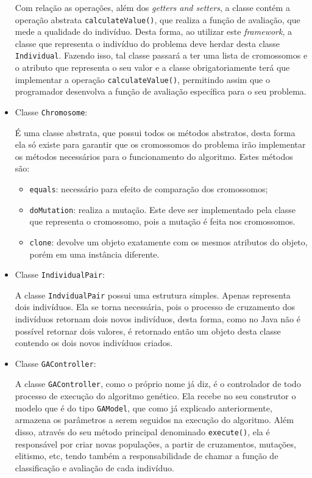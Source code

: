 \begin{itemize}
	\par Com relação as operações, além dos \textit{getters and setters}, a classe contém a operação abstrata 
	\texttt{calculateValue()}, que realiza a função de avaliação, que mede a qualidade do indivíduo. Desta forma, ao utilizar este \textit{framework}, a classe que representa o indivíduo do 
	problema deve herdar desta classe  \texttt{Individual}. Fazendo isso, tal classe passará a ter uma lista de cromossomos 
	e o atributo que representa o seu valor e a classe obrigatoriamente terá que implementar a operação 
	\texttt{calculateValue()}, permitindo assim que o programador 
	desenvolva a função de avaliação específica para o seu problema.
	
	
	\item Classe \texttt{Chromosome}:
	\par É uma classe abstrata, que possui todos os métodos abstratos, desta forma
	ela só existe para garantir que os cromossomos do problema irão implementar os
	métodos necessários para o funcionamento do algoritmo. Estes métodos são:
	
	\begin{itemize}
		
		\item \texttt{equals}: necessário para efeito de comparação dos cromossomos;
		
		\item \texttt{doMutation}: realiza a mutação. Este deve
		ser implementado pela classe que representa o cromossomo, pois a
		mutação é feita nos cromossomos.
		
		\item \texttt{clone}: devolve um objeto exatamente com os mesmos
		atributos do objeto, porém em uma instância diferente.
		
	\end{itemize}
	
	
	\item Classe \texttt{IndividualPair}:
	\par A classe \texttt{IndvidualPair} possui uma estrutura simples. Apenas
	representa dois indivíduos. Ela se torna necessária, pois o processo de
	cruzamento dos indivíduos retornam dois novos indivíduos, desta forma, como 
	no Java não é possível retornar dois valores, é retornado então um objeto desta
	classe contendo os dois novos indivíduos criados. 
	
	
	\item Classe \texttt{GAController}:
	\par A classe \texttt{GAController}, como o próprio nome já diz, é o
	controlador de todo processo de execução do algoritmo genético.
	Ela recebe no seu construtor o modelo que é do tipo \texttt{GAModel}, que como
	já explicado anteriormente, armazena os parâmetros a serem seguidos na
	execução do algoritmo. Além disso, através do seu método principal
	denominado \texttt{execute()}, ela é responsável por criar novas populações, a
	partir de cruzamentos, mutações, elitismo, etc, tendo também a
	responsabilidade de chamar a função de classificação e avaliação de cada indivíduo.
	

\end{itemize}
